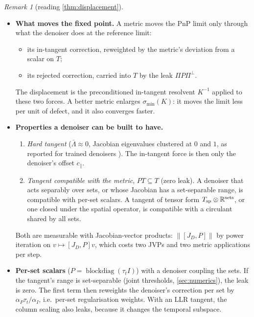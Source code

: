 \documentclass[11pt]{article}
\theoremstyle{definition}
\theoremstyle{remark}
\newtheorem{remark}[theorem]{Remark}
\newcommand{\RR}{\mathbb R}
\newcommand{\norm}[1]{\lVert #1\rVert}
\begin{document}
\begin{remark}[reading \cref{thm:displacement}]\label{rem:displacement}
\begin{itemize}
\item \textbf{What moves the fixed point.} A metric moves the PnP limit only through what the denoiser does at
  the reference limit:
  \begin{itemize}
  \item its in-tangent correction, reweighted by the metric's deviation from a scalar on $T$;
  \item its rejected correction, carried into $T$ by the leak $\Pi P\Pi^\perp$.
  \end{itemize}
  The displacement is the preconditioned in-tangent resolvent $K^{-1}$ applied to these two forces. A better
  metric enlarges $\sigma_{\min}(K)$: it moves the limit less per unit of defect, and it also converges faster.
\item \textbf{Properties a denoiser can be built to have.}
  \begin{enumerate}
  \item[(a)] \emph{Hard tangent} ($\bar\Lambda\approx0$, Jacobian eigenvalues clustered at $0$ and $1$, as reported
    for trained denoisers \cite{mohan2020,kadkhodaie2024}). The in-tangent force is then only the denoiser's
    offset $c_\parallel$.
  \item[(b)] \emph{Tangent compatible with the metric}, $PT\subseteq T$ (zero leak). A denoiser that acts
    separably over sets, or whose Jacobian has a set-separable range, is compatible with per-set scalars. A
    tangent of tensor form $T_{\rm sp}\otimes\RR^{\rm sets}$, or one closed under the spatial operator, is
    compatible with a circulant shared by all sets.
  \end{enumerate}
  Both are measurable with Jacobian-vector products: $\norm{[J_D,P]}$ by power iteration on
  $v\mapsto[J_D,P]v$, which costs two JVPs and two metric applications per step.
\item \textbf{Per-set scalars} ($P=\operatorname{blockdiag}(\tau_tI)$) with a denoiser coupling the sets. If the
  tangent's range is set-separable (joint thresholds, \cref{sec:numerics}), the leak is zero. The first term then
  reweights the denoiser's correction per set by $\alpha_P\tau_t/\alpha_I$, i.e.\ per-set regularisation weights.
  With an LLR tangent, the column scaling also leaks, because it changes the temporal subspace.
\end{itemize}
\end{remark}
\end{document}
